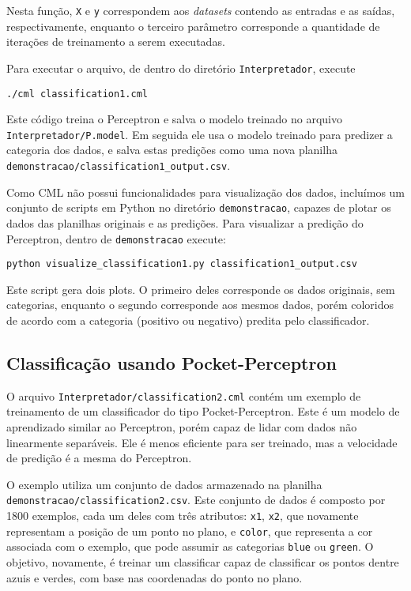 \documentclass[12pt]{article}
\begin{document}
Nesta função, \texttt{X} e \texttt{y} correspondem aos \textit{datasets} contendo as entradas e as saídas, respectivamente, enquanto o terceiro parâmetro corresponde a quantidade de iterações de treinamento a serem executadas.

Para executar o arquivo, de dentro do diretório \texttt{Interpretador}, execute

\begin{verbatim}
./cml classification1.cml
\end{verbatim}

Este código treina o Perceptron e salva o modelo treinado no arquivo \texttt{Interpretador/P.model}. Em seguida ele usa o modelo treinado para predizer a categoria dos dados, e salva estas predições como uma nova planilha \texttt{demonstracao/classification1\_output.csv}.

Como CML não possui funcionalidades para visualização dos dados, incluímos um conjunto de scripts em Python no diretório \texttt{demonstracao}, capazes de plotar os dados das planilhas originais e as predições. Para visualizar a predição do Perceptron, dentro de \texttt{demonstracao} execute:

\begin{verbatim}
python visualize_classification1.py classification1_output.csv
\end{verbatim}

Este script gera dois plots. O primeiro deles corresponde os dados originais, sem categorias, enquanto o segundo corresponde aos mesmos dados, porém coloridos de acordo com a categoria (positivo ou negativo) predita pelo classificador.

\subsection{Classificação usando Pocket-Perceptron}

O arquivo \texttt{Interpretador/classification2.cml} contém um exemplo de treinamento de um classificador do tipo Pocket-Perceptron. Este é um modelo de aprendizado similar ao Perceptron, porém capaz de lidar com dados não linearmente separáveis. Ele é menos eficiente para ser treinado, mas a velocidade de predição é a mesma do Perceptron.

O exemplo utiliza um conjunto de dados armazenado na planilha \texttt{demonstracao/classification2.csv}. Este conjunto de dados é composto por 1800 exemplos, cada um deles com três atributos: \texttt{x1}, \texttt{x2}, que novamente representam a posição de um ponto no plano, e \texttt{color}, que representa a cor associada com o exemplo, que pode assumir as categorias \texttt{blue} ou \texttt{green}. O objetivo, novamente, é treinar um classificar capaz de classificar os pontos dentre azuis e verdes, com base nas coordenadas do ponto no plano. 
\end{document}
